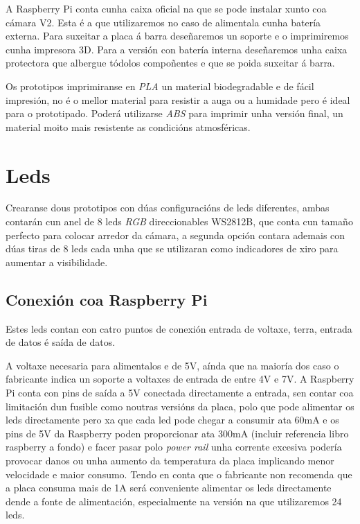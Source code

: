 A Raspberry Pi conta cunha caixa oficial na que se pode instalar xunto coa cámara V2. Esta é a que utilizaremos no caso de alimentala cunha batería externa. Para suxeitar a placa á barra deseñaremos un soporte e o imprimiremos cunha impresora 3D. Para a versión con batería interna deseñaremos unha caixa protectora que albergue tódolos compoñentes e que se poida suxeitar á barra.

Os prototipos imprimiranse en \emph{PLA} un material biodegradable e de fácil impresión, no é o mellor material para resistir a auga ou a humidade pero é ideal para o prototipado. Poderá utilizarse \emph{ABS} para imprimir unha versión final, un material moito mais resistente as condicións atmosféricas.

\section{Leds}

Crearanse dous prototipos con dúas configuracións de leds diferentes, ambas contarán cun anel de 8 leds \emph{RGB} direccionables WS2812B, que conta cun tamaño perfecto para colocar arredor da cámara, a segunda opción contara ademais con dúas tiras de 8 leds cada unha que se utilizaran como indicadores de xiro para aumentar a visibilidade.
\subsection{Conexión coa Raspberry Pi}
Estes leds contan con catro puntos de conexión entrada de voltaxe, terra, entrada de datos é saída de datos.

A voltaxe necesaria para alimentalos e de 5V, aínda que na maioría dos caso o fabricante indica un soporte a voltaxes de entrada de entre 4V e 7V. A Raspberry Pi conta con pins de saída a 5V conectada directamente a entrada, sen contar coa limitación dun fusible como noutras versións da placa, polo que pode alimentar os leds directamente pero xa que cada led pode chegar a consumir ata 60mA e os pins de 5V da Raspberry poden proporcionar ata 300mA (incluir referencia libro raspberry a fondo) e facer pasar polo \emph{power rail} unha corrente excesiva podería provocar danos ou unha aumento da temperatura da placa implicando menor velocidade e maior consumo. Tendo en conta que o fabricante non recomenda que a placa consuma mais de 1A será conveniente alimentar os leds directamente dende a fonte de alimentación, especialmente na versión na que utilizaremos 24 leds.


